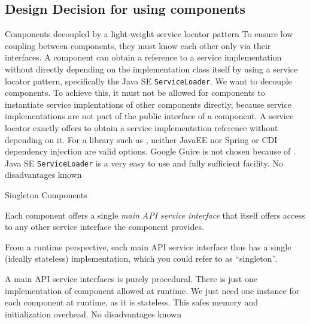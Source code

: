
\subsection{Design Decision for using components}
\label{sec:DesVerwKomp}

{%
Components decoupled by a light-weight service locator pattern
}
{%
To ensure low coupling between components, they must know each other only via their interfaces. A component can obtain a reference to a service implementation without directly depending on the implementation class itself by using a service locator pattern, specifically the Java SE \texttt{ServiceLoader}.
}
{%
We want to decouple components. To achieve this, it must not be allowed for components to instantiate service implentations of other components directly, because service implementations are not part of the public interface of a component. A service locator exactly offers to obtain a service implementation reference without depending on it. For a library such as \LibName{}, neither JavaEE nor Spring or CDI dependency injection are valid options. Google Guice is not chosen because of . Java SE \texttt{ServiceLoader} is a very easy to use and fully sufficient facility.
}
{%
No disadvantages known
}


{%
Singleton Components
}
{%
Each component offers a single \emph{main API service interface} that itself offers access to any other service interface the component provides.

From a runtime perspective, each main API service interface thus has a single (ideally stateless) implementation, which you could refer to as ``singleton''.
}
{%
A main API service interfaces is purely procedural. There is just one implementation of component allowed at runtime. We just need one instance for each component at runtime, as it is stateless. This safes memory and initialization overhead.
}
{%
No disadvantages known
}

